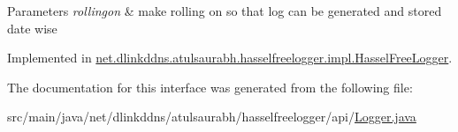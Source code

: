 \begin{DoxyParams}{Parameters}
{\em rollingon} & make rolling on so that log can be generated and stored date wise \\
\hline
\end{DoxyParams}


Implemented in \mbox{\hyperlink{classnet_1_1dlinkddns_1_1atulsaurabh_1_1hasselfreelogger_1_1impl_1_1_hassel_free_logger_a9ef8b4f7c9615f50c03f168f1b949f64}{net.\+dlinkddns.\+atulsaurabh.\+hasselfreelogger.\+impl.\+Hassel\+Free\+Logger}}.



The documentation for this interface was generated from the following file\+:\begin{DoxyCompactItemize}
\item 
src/main/java/net/dlinkddns/atulsaurabh/hasselfreelogger/api/\mbox{\hyperlink{_logger_8java}{Logger.\+java}}\end{DoxyCompactItemize}
